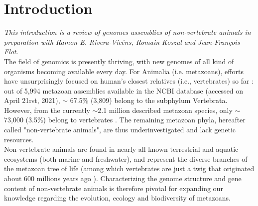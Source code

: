 
\chapter{Introduction}

\textit{This introduction is a review of genomes assemblies of non-vertebrate animals in preparation with Ramon E. Rivera-Vicéns, Romain Koszul and Jean-François Flot.} \\

The field of genomics is presently thriving, with new genomes of all kind of organisms becoming available every day. For Animalia (i.e. metazoans), efforts have unsurprisingly focused on human's closest relatives (i.e., vertebrates) so far \cite{rice2019}: out of 5,994 metazoan assemblies available in the NCBI database (accessed on April 21rst, 2021), $\sim$ 67.5\% (3,809) belong to the subphylum Vertebrata. However, from the currently $\sim$2.1 million described metazoan species, only $\sim$73,000 (3.5\%) belong to vertebrates \cite{red_list}. The remaining metazoan phyla, hereafter called "non-vertebrate animals", are thus underinvestigated and lack genetic resources. \\ 

Non-vertebrate animals are found in nearly all known terrestrial and aquatic ecosystems (both marine and freshwater), and represent the diverse branches of the metazoan tree of life (among which vertebrates are just a twig that originated about 600 millions years ago \cite{timetree}). Characterizing the genome structure and gene content of non-vertebrate animals is therefore pivotal for expanding our knowledge regarding the evolution, ecology and biodiversity of metazoans. \\

